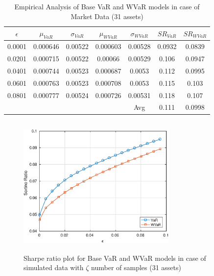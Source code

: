 \documentclass[12pt]{article}
\numberwithin{equation}{section}
\begin{document}
\begin{table}[!h]
\centering
\captionsetup{justification=centering}
\begin{tabular}{||c|c|c|c|c|c|c||}
\hline
$\epsilon$ & $\mu_{VaR}$ & $\sigma_{VaR}$ & $\mu_{WVaR}$ & $\sigma_{WVaR}$ & $SR_{VaR}$ & $SR_{WVaR}$\\
\hline
0.0001 & 0.000646 & 0.00522 & 0.000603 & 0.00528 & 0.0932 & 0.0839 \\
0.0201 & 0.000715 & 0.00522 & 0.00066 & 0.00529 & 0.106 & 0.0947 \\
0.0401 & 0.000744 & 0.00523 & 0.000687 & 0.0053 & 0.112 & 0.0995 \\
0.0601 & 0.000763 & 0.00523 & 0.000708 & 0.0053 & 0.115 & 0.103 \\
0.0801 & 0.000777 &0.00524 & 0.000726 & 0.00531 & 0.118 & 0.107 \\
\hline
& & & & Avg & 0.111	& 0.0998 \\
\hline
\end{tabular}
\caption{Empirical Analysis of Base VaR and WVaR models in case of Market Data (31 assets)}
\label{tab:5.1}
\end{table}

\begin{figure}[!h]
\centering
\includegraphics[height=7.0cm,width=0.7\textwidth]{VaR/bse30_simulated/sr_exact_cheb.eps}
\caption{Sharpe ratio plot for Base VaR and WVaR models in case of simulated data with $\zeta$ number of samples (31 assets)}
\label{fig:5.2}
\end{figure}
\end{document}
